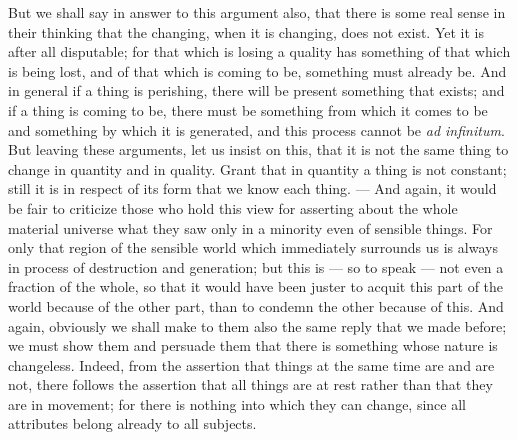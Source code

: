 But we shall say in answer to this argument also, that there is some real sense in their thinking that the changing, when it is changing, does not exist. Yet it is after all disputable; for that which is losing a quality has something of that which is being lost, and of that which is coming to be, something must already be. And in general if a thing is perishing, there will be present something that exists; and if a thing is coming to be, there must be something from which it comes to be and something by which it is generated, and this process cannot be \emph{ad infinitum}. But leaving these arguments, let us insist on this, that it is not the same thing to change in quantity and in quality. Grant that in quantity a thing is not constant; still it is in respect of its form that we know each thing. — And again, it would be fair to criticize those who hold this view for asserting about the whole material universe what they saw only in a minority even of sensible things. For only that region of the sensible world which immediately surrounds us is always in process of destruction and generation; but this is — so to speak — not even a fraction of the whole, so that it would have been juster to acquit this part of the world because of the other part, than to condemn the other because of this. And again, obviously we shall make to them also the same reply that we made before; we must show them and persuade them that there is something whose nature is changeless. Indeed, from the assertion that things at the same time are and are not, there follows the assertion that all things are at rest rather than that they are in movement; for there is nothing into which they can change, since all attributes belong already to all subjects.

